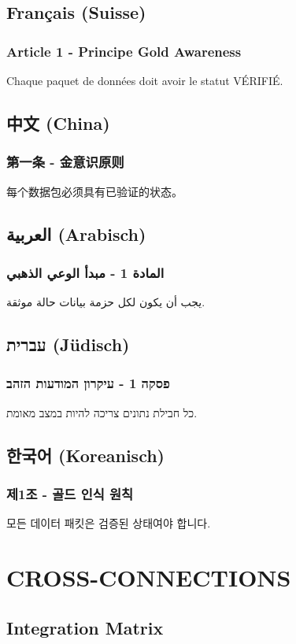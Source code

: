 \documentclass[11pt,a4paper]{report}
\begin{document}
\section{Français (Suisse)}
\subsection{Article 1 - Principe Gold Awareness}
Chaque paquet de données doit avoir le statut VÉRIFIÉ.

\section{中文 (China)}
\subsection{第一条 - 金意识原则}
每个数据包必须具有已验证的状态。

\section{العربية (Arabisch)}
\subsection{المادة 1 - مبدأ الوعي الذهبي}
يجب أن يكون لكل حزمة بيانات حالة موثقة.

\section{עברית (Jüdisch)}
\subsection{פסקה 1 - עיקרון המודעות הזהב}
כל חבילת נתונים צריכה להיות במצב מאומת.

\section{한국어 (Koreanisch)}
\subsection{제1조 - 골드 인식 원칙}
모든 데이터 패킷은 검증된 상태여야 합니다.

\chapter{CROSS-CONNECTIONS}

\section{Integration Matrix}
\end{document}
